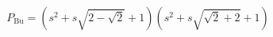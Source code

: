 \begin{equation}
P_{\mathrm{Bu}} = \left(s^{2} + s \sqrt{2 - \sqrt{2}} + 1\right) \left(s^{2} + s \sqrt{\sqrt{2} + 2} + 1\right)
\end{equation}

